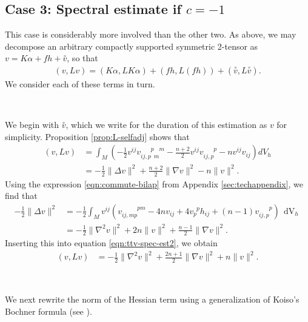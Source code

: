 \documentclass[10pt,reqno]{amsart}
\DeclareMathOperator{\dvol}{dV}
\newcommand{\ttv}{\stackrel{\circ}{v}}
\newcommand{\vdu}[2]{v_{#1}^{\phantom{#1} #2}}
\newcommand{\vdddu}[4]{v_{#1 #2, #3}^{\phantom{#1#2,#3} #4}}
\newcommand{\vdddudu}[6]{v_{#1#2,#3\phantom{#4}#5\phantom{#6}}^{\phantom{#1#2,#3}#4\phantom{#5}#6}}
\begin{document}
\bigskip

\subsection{\bf Case 3: Spectral estimate if $c=-1$}
\label{sec:spec hyp}

This case is considerably more involved than the other two.  As above, we may decompose an arbitrary compactly supported symmetric 2-tensor as
$v = K \alpha + f h + \ttv$, so that 
\begin{align} \label{eqn:split-spec-est}
(v, Lv) = (K\alpha, L K \alpha) + (f h, L( fh)) + ( \ttv, L\ttv).
\end{align}
We consider each of these terms in turn.

\

We begin with $\ttv$, which we write for the duration of this estimation as $v$ for simplicity.  Proposition \ref{prop:L-selfadj} shows that
\begin{align}
\label{eqn:ttv-spec-est2}
( v, L v) &= \int_{M} (-\frac{1}{2} v^{ij} \vdddudu{i}{j}{p}{p}{m}{m} - \frac{n+2}{2} v^{ij} \vdddu{i}{j}{p}{p} - 
n v^{ij} v_{ij}) dV_h \nonumber \\  &= -\frac{1}{2} \| \Delta v \|^2  +  \frac{n+2}{2} \| \nabla v \|^2  - n \|v\|^2.
\end{align}
Using the expression \eqref{eqn:commute-bilap} from Appendix \ref{sec:techappendix}, we find that
\begin{align*}
\nonumber -\frac{1}{2} \| \Delta v \|^2  &= -\frac{1}{2} \int_{M} v^{ij} (\vdddu{i}{j}{mp}{pm} -4 n v_{ij} + 4 \vdu{p}{p} h_{ij}  + 
(n-1) \vdddu{i}{j}{p}{p}) \, \dvol_h \\ &= -\frac{1}{2} \| \nabla^2 v\|^2 + 2 n \|v\|^2 + \frac{n-1}{2} \| \nabla v\|^2.
\end{align*}
Inserting this into equation \eqref{eqn:ttv-spec-est2}, we obtain
\begin{align} \label{eqn:int-est1}
(v, Lv) &=  -\frac{1}{2} \| \nabla^2 v\|^2   +  \frac{2n+1}{2} \| \nabla v\|^2 + n \|v\|^2.
\end{align}

\

We next rewrite the norm of the Hessian term using a generalization of Koiso's Bochner formula (see \cite{Lee}).
\end{document}
